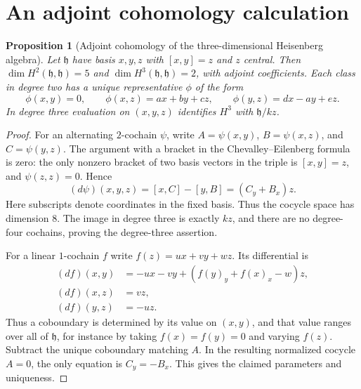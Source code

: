 \documentclass[11pt,oneside,openany]{book}
\newtheorem{proposition}[theorem]{Proposition}
\theoremstyle{definition}
\theoremstyle{remark}
\begin{document}
\section{An adjoint cohomology calculation}

\begin{proposition}[Adjoint cohomology of the three-dimensional Heisenberg algebra]
\label{res:LD01}
Let \(\mathfrak h\) have basis \(x,y,z\) with
\([x,y]=z\) and \(z\) central. Then
\(\dim H^2(\mathfrak h,\mathfrak h)=5\) and
\(\dim H^3(\mathfrak h,\mathfrak h)=2\), with adjoint
coefficients. Each class in degree two has a unique representative
\(\phi\) of the form
\[
 \phi(x,y)=0,\qquad
 \phi(x,z)=a x+b y+c z,\qquad
 \phi(y,z)=d x-a y+e z .
\]
In degree three evaluation on \((x,y,z)\) identifies
\(H^3\) with \(\mathfrak h/kz\).
\end{proposition}
\begin{proof}
For an alternating \(2\)-cochain \(\psi\), write
\(A=\psi(x,y)\), \(B=\psi(x,z)\), and \(C=\psi(y,z)\).
The argument with a bracket in the Chevalley--Eilenberg
formula is zero: the only nonzero bracket of two basis vectors
in the triple is \([x,y]=z\), and \(\psi(z,z)=0\).
Hence
\[
 (d\psi)(x,y,z)=[x,C]-[y,B]
               =(C_y+B_x)z .
\]
Here subscripts denote coordinates in the fixed basis.
Thus the cocycle space has dimension \(8\). The image in
degree three is exactly \(kz\), and there are no degree-four
cochains, proving the degree-three assertion.

For a linear \(1\)-cochain \(f\) write
\(f(z)=u x+v y+w z\). Its differential is
\[
 \begin{aligned}
 (df)(x,y)&=-u x-v y+(f(y)_y+f(x)_x-w)z,\\
 (df)(x,z)&=v z,\\
 (df)(y,z)&=-u z.
 \end{aligned}
\]
Thus a coboundary is determined by its value on \((x,y)\),
and that value ranges over all of \(\mathfrak h\), for instance
by taking \(f(x)=f(y)=0\) and varying \(f(z)\).
Subtract the unique coboundary matching \(A\). In the resulting
normalized cocycle \(A=0\), the only equation is
\(C_y=-B_x\). This gives the claimed parameters and uniqueness.
\end{proof}
\end{document}
